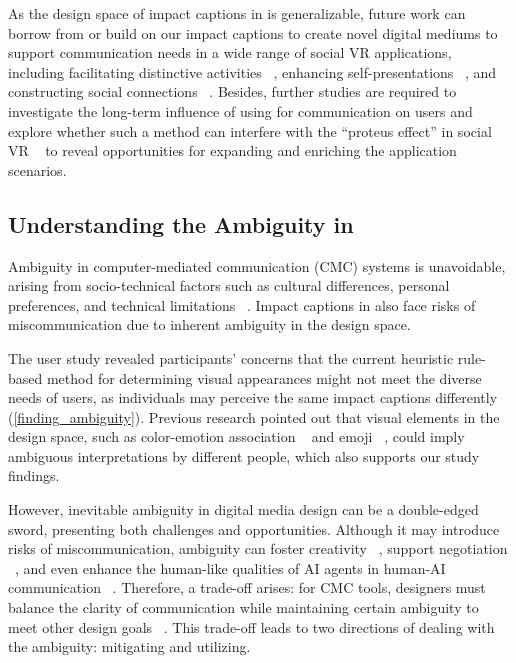 As the design space of impact captions in \system{} is generalizable, future work can borrow from or build on our impact captions to create novel digital mediums to support communication needs in a wide range of social VR applications, including facilitating distinctive activities ~\cite{chen2024drink, maloney2020falling}, enhancing self-presentations ~\cite{freeman2021body, sykownik2022something, maloney2020talking}, and constructing social connections ~\cite{li2019measuring}. Besides, further studies are required to investigate the long-term influence of using \system{} for communication on users and explore whether such a method can interfere with the ``proteus effect'' in social VR ~\cite{maloney2020talking} to reveal opportunities for expanding and enriching the application scenarios.


\subsection{Understanding the Ambiguity in \system{}}
Ambiguity in computer-mediated communication (CMC) systems is unavoidable, arising from socio-technical factors such as cultural differences, personal preferences, and technical limitations ~\cite{stacey2003against, aoki2005making}.
Impact captions in \system{} also face risks of miscommunication due to inherent ambiguity in the design space.

The user study revealed participants' concerns that the current heuristic rule-based method for determining visual appearances might not meet the diverse needs of users, as individuals may perceive the same impact captions differently (\autoref{finding_ambiguity}).
Previous research pointed out that visual elements in the design space, such as color-emotion association ~\cite{hanada2018correspondence, wilms2018color} and emoji ~\cite{czkestochowska2022context, miller2017understanding}, could imply ambiguous interpretations by different people, which also supports our study findings.

However, inevitable ambiguity in digital media design can be a double-edged sword, presenting both challenges and opportunities. 
Although it may introduce risks of miscommunication, ambiguity can foster creativity ~\cite{stacey2003against}, support negotiation ~\cite{gaver2003ambiguity}, and even enhance the human-like qualities of AI agents in human-AI communication ~\cite{liu2024let}.
Therefore, a trade-off arises: for CMC tools, designers must balance the clarity of communication while maintaining certain ambiguity to meet other design goals ~\cite{stacey2003against, aoki2005making}. This trade-off leads to two directions of dealing with the ambiguity: mitigating and utilizing.

